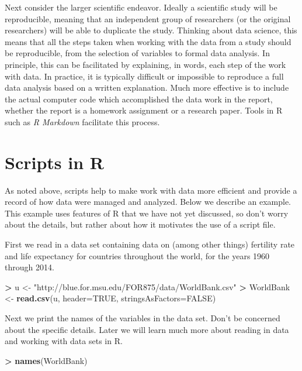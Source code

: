 \documentclass[]{krantz}
\makeatletter
\newenvironment{Shaded}{\begin{snugshade}}{\end{snugshade}}
\newcommand{\KeywordTok}[1]{\textcolor[rgb]{0.27,0.27,0.27}{\textbf{#1}}}
\newcommand{\DataTypeTok}[1]{\textcolor[rgb]{0.27,0.27,0.27}{#1}}
\newcommand{\StringTok}[1]{\textcolor[rgb]{0.5,0.5,0.5}{#1}}
\newcommand{\OtherTok}[1]{\textcolor[rgb]{0.37,0.37,0.37}{#1}}
\newcommand{\OperatorTok}[1]{\textcolor[rgb]{0.43,0.43,0.43}{\textbf{#1}}}
\newcommand{\NormalTok}[1]{#1}
\newenvironment{kframe}{%
\medskip{}
\setlength{\fboxsep}{.8em}
 \def\at@end@of@kframe{}%
 \ifinner\ifhmode%
  \def\at@end@of@kframe{\end{minipage}}%
  \begin{minipage}{\columnwidth}%
 \fi\fi%
 \def\FrameCommand##1{\hskip\@totalleftmargin \hskip-\fboxsep
 \colorbox{shadecolor}{##1}\hskip-\fboxsep
     \hskip-\linewidth \hskip-\@totalleftmargin \hskip\columnwidth}%
 \MakeFramed {\advance\hsize-\width
   \@totalleftmargin\z@ \linewidth\hsize
   \@setminipage}}%
 {\par\unskip\endMakeFramed%
 \at@end@of@kframe}
\renewenvironment{Shaded}{\begin{kframe}}{\end{kframe}}
\makeatother
\begin{document}
Next consider the larger scientific endeavor. Ideally a scientific study
will be reproducible, meaning that an independent group of researchers
(or the original researchers) will be able to duplicate the study.
Thinking about data science, this means that all the steps taken when
working with the data from a study should be reproducible, from the
selection of variables to formal data analysis. In principle, this can
be facilitated by explaining, in words, each step of the work with data.
In practice, it is typically difficult or impossible to reproduce a full
data analysis based on a written explanation. Much more effective is to
include the actual computer code which accomplished the data work in the
report, whether the report is a homework assignment or a research paper.
Tools in R such as \emph{R Markdown} facilitate this process.

\section{Scripts in R}\label{scripts-in-r}

As noted above, scripts help to make work with data more efficient and
provide a record of how data were managed and analyzed. Below we
describe an example. This example uses features of R that we have not
yet discussed, so don't worry about the details, but rather about how it
motivates the use of a script file.

First we read in a data set containing data on (among other things)
fertility rate and life expectancy for countries throughout the world,
for the years 1960 through 2014.

\begin{Shaded}
\begin{Highlighting}[]
\OperatorTok{>}\StringTok{ }\NormalTok{u <-}\StringTok{ "http://blue.for.msu.edu/FOR875/data/WorldBank.csv"}
\OperatorTok{>}\StringTok{ }\NormalTok{WorldBank <-}\StringTok{ }\KeywordTok{read.csv}\NormalTok{(u, }\DataTypeTok{header=}\OtherTok{TRUE}\NormalTok{, }\DataTypeTok{stringsAsFactors=}\OtherTok{FALSE}\NormalTok{)}
\end{Highlighting}
\end{Shaded}

Next we print the names of the variables in the data set. Don't be
concerned about the specific details. Later we will learn much more
about reading in data and working with data sets in R.

\begin{Shaded}
\begin{Highlighting}[]
\OperatorTok{>}\StringTok{ }\KeywordTok{names}\NormalTok{(WorldBank)}
\end{Highlighting}
\end{Shaded}
\end{document}
